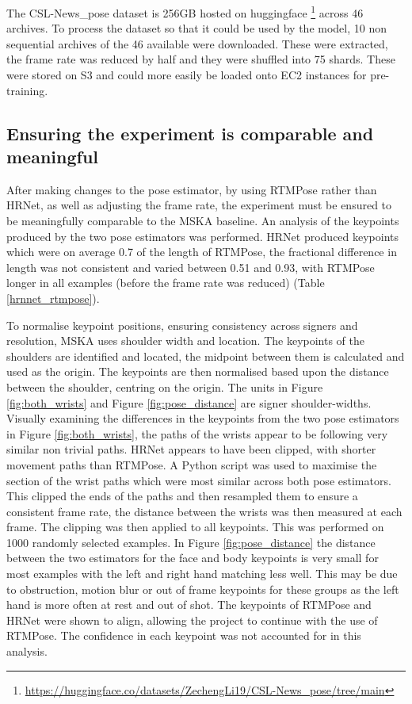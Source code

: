 \documentclass{article}
\begin{document}
The CSL-News\_pose dataset is 256GB hosted on huggingface \footnote{\url{https://huggingface.co/datasets/ZechengLi19/CSL-News\_pose/tree/main}} across 46 archives. To process the dataset so that it could be used by the model, 10 non sequential archives of the 46 available were downloaded. These were extracted, the frame rate was reduced by half and they were shuffled into 75 shards. These were stored on S3 and could more easily be loaded onto EC2 instances for pre-training.

\subsection{Ensuring the experiment is comparable and meaningful}
After making changes to the pose estimator, by using RTMPose rather than HRNet, as well as adjusting the frame rate, the experiment must be ensured to be meaningfully comparable to the MSKA baseline. An analysis of the keypoints produced by the two pose estimators was performed. HRNet produced keypoints which were on average 0.7 of the length of RTMPose, the fractional difference in length was not consistent and varied between 0.51 and 0.93, with RTMPose longer in all examples (before the frame rate was reduced) (Table \ref{hrnnet_rtmpose}).  

To normalise keypoint positions, ensuring consistency across signers and resolution, MSKA uses shoulder width and location. The keypoints of the shoulders are identified and located, the midpoint between them is calculated and used as the origin. The keypoints are then normalised based upon the distance between the shoulder, centring on the origin. The units in Figure \ref{fig:both_wrists} and Figure \ref{fig:pose_distance} are signer shoulder-widths. Visually examining the differences in the keypoints from the two pose estimators in Figure \ref{fig:both_wrists}, the paths of the wrists appear to be following very similar non trivial paths. HRNet appears to have been clipped, with shorter movement paths than RTMPose. A Python script was used to maximise the section of the wrist paths which were most similar across both pose estimators. This clipped the ends of the paths and then resampled them to ensure a consistent frame rate, the distance between the wrists was then measured at each frame. The clipping was then applied to all keypoints. This was performed on 1000 randomly selected examples. In Figure \ref{fig:pose_distance} the distance between the two estimators for the face and body keypoints is very small for most examples with the left and right hand matching less well. This may be due to obstruction, motion blur or out of frame keypoints for these groups as the left hand is more often at rest and out of shot. The keypoints of RTMPose and HRNet were shown to align, allowing the project to continue with the use of RTMPose. The confidence in each keypoint was not accounted for in this analysis.
\end{document}
